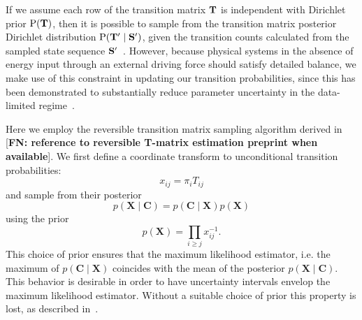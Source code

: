 \documentclass[aps,pre,twocolumn,superscriptaddress,nofootinbib,longbibliography]{revtex4-1}
\newcommand{\bfm}[1]{{\bf #1}}
\renewcommand{\Pr}{\mathrm{P}}
\begin{document}
{%
{\color{red} If we assume each row of the transition matrix $\bfm{T}$ is independent with Dirichlet prior $\Pr(\bfm{T})$, then it is possible to sample from the transition matrix posterior Dirichlet distribution $\Pr(\bfm{T}' \mid \bfm{S}')$, given the transition counts calculated from the sampled state sequence $\bfm{S}'$~\cite{noe:jcp:2008:transition-matrix-sampling}.}
However, because physical systems in the absence of energy input through an external driving force should satisfy detailed balance, we make use of this constraint in updating our transition probabilities, since this has been demonstrated to substantially reduce parameter uncertainty in the data-limited regime~\cite{noe:jcp:2008:transition-matrix-sampling}.



\color{magenta}

Here we employ the reversible transition matrix sampling algorithm derived in [{\bf FN: reference to reversible T-matrix estimation preprint when available}]. We first define a coordinate transform to unconditional transition probabilities:
\begin{equation}
  \label{eq:transformation_T_X}
  x_{ij} = \pi_{i} T_{ij}
\end{equation}
and sample from their posterior 
\begin{equation}
  \label{eq:X_posterior}
   p(\mathbf{X} \mid \mathbf{C} ) = p(\mathbf{C} \mid \mathbf{X}) p(\mathbf{X})
\end{equation}
using the prior
\begin{equation}
  \label{eq:X_prior}
   p(\mathbf{X}) = \prod_{i \ge j} x_{ij}^{-1}.
\end{equation}
This choice of prior ensures that the maximum likelihood estimator, i.e. the maximum of $p(\mathbf{C} \mid \mathbf{X})$ coincides with
the mean of the posterior $p(\mathbf{X} \mid \mathbf{C} )$. This behavior is desirable in order to have uncertainty intervals envelop the
maximum likelihood estimator. Without a suitable choice of prior this property is lost, as described in~\cite{noe:pnas:2009:ww-domain}.

}
\end{document}
